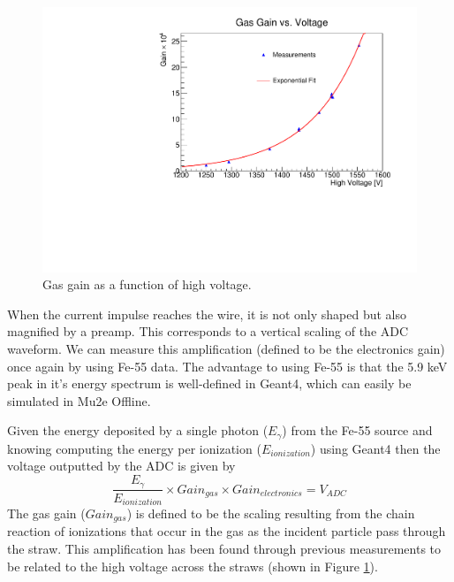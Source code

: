 \begin{figure}[htp!]
    \centering
    \includegraphics[scale=0.5]{Images2/gasGainVsVoltage.pdf}
    \caption{Gas gain as a function of high voltage.}
    \label{fig:gasGain}
\end{figure} 
When the current impulse reaches the wire, it is not only shaped but also magnified by a preamp. This corresponds to a vertical scaling of the ADC waveform. 
We can measure this amplification (defined to be the electronics gain) once again by using Fe-55 data. The advantage to using Fe-55 is that the 5.9 keV peak in it's energy spectrum is well-defined in Geant4, which can easily be simulated in Mu2e Offline. 

Given the energy deposited by a single photon ($E_{\gamma}$) from the Fe-55 source and knowing computing the energy per ionization ($E_{ionization}$) using Geant4 then the voltage outputted by the ADC is given by
\begin{equation}
	 \frac{E_{\gamma}}{E_{ionization}} \times {Gain_{gas}} \times Gain_{electronics} = V_{ADC}
	 \label{eq:electronicsGain}
\end{equation}
The gas gain ($Gain_{gas}$) is defined to be the scaling resulting from the chain reaction of ionizations that occur in the gas as the incident particle pass through the straw. This amplification has been found through previous measurements to be related to the high voltage across the straws (shown in Figure \ref{fig:gasGain}). 

